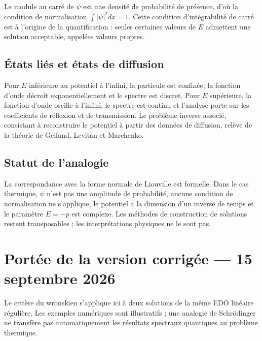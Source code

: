 \documentclass[11pt,a4paper]{article}
\begin{document}
Le module au carré de $\psi$ est une densité de probabilité de présence, d'où la condition de
normalisation $\int|\psi|^{2}dx = 1$. Cette condition d'intégrabilité de carré est à l'origine de la
quantification : seules certaines valeurs de $E$ admettent une solution acceptable, appelées valeurs
propres.

\subsection{États liés et états de diffusion}

Pour $E$ inférieure au potentiel à l'infini, la particule est confinée, la fonction d'onde décroît
exponentiellement et le spectre est discret. Pour $E$ supérieure, la fonction d'onde oscille à
l'infini, le spectre est continu et l'analyse porte sur les coefficients de réflexion et de
transmission. Le problème inverse associé, consistant à reconstruire le potentiel à partir des données
de diffusion, relève de la théorie de Gelfand, Levitan et Marchenko.

\subsection{Statut de l'analogie}

La correspondance avec la forme normale de Liouville est formelle. Dans le cas thermique, $\psi$ n'est
pas une amplitude de probabilité, aucune condition de normalisation ne s'applique, le potentiel a la
dimension d'un inverse de temps et le paramètre $E = -p$ est complexe. Les méthodes de construction de
solutions restent transposables ; les interprétations physiques ne le sont pas.
\section*{Portée de la version corrigée --- 15 septembre 2026}
Le critère du wronskien s'applique ici à deux solutions de la même EDO linéaire régulière. Les exemples numériques sont illustratifs ; une analogie de Schrödinger ne transfère pas automatiquement les résultats spectraux quantiques au problème thermique.
\end{document}
